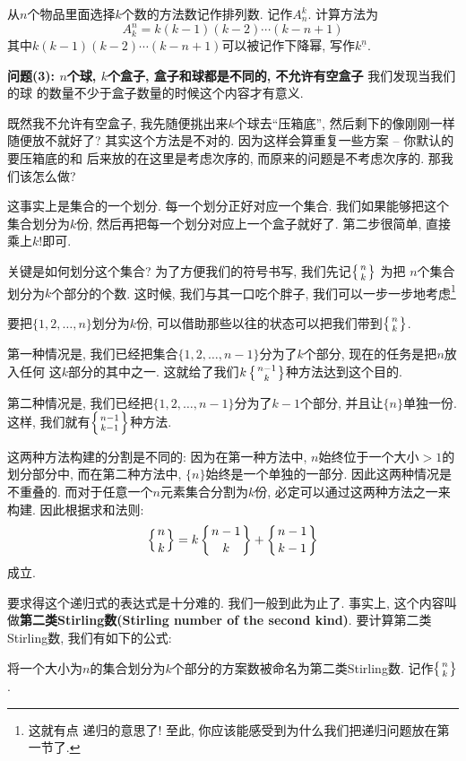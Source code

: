 \begin{definition}[排列数]
    从$n$个物品里面选择$k$个数的方法数记作排列数. 记作$A_n^k$. 计算方法为
    $$
        A_k^n = k(k-1)(k-2)\cdots(k-n+1)
    $$
    其中$k(k-1)(k-2)\cdots(k-n+1)$可以被记作下降幂, 写作$k^{\underline n}$.
\end{definition}

\textbf{问题(3): $n$个球, $k$个盒子, 盒子和球都是不同的, 不允许有空盒子} 我们发现当我们的球
的数量不少于盒子数量的时候这个内容才有意义.

既然我不允许有空盒子, 我先随便挑出来$k$个球去``压箱底'', 然后剩下的像刚刚一样
随便放不就好了? 其实这个方法是不对的. 因为这样会算重复一些方案 -- 你默认的要压箱底的和
后来放的在这里是考虑次序的, 而原来的问题是不考虑次序的. 那我们该怎么做?

这事实上是集合的一个划分. 每一个划分正好对应一个集合. 我们如果能够把这个集合划分为$k$份,
然后再把每一个划分对应上一个盒子就好了. 第二步很简单, 直接乘上$k!$即可.

关键是如何划分这个集合? 为了方便我们的符号书写, 我们先记$\left\{{n \atop k}\right\}$ 为把
$n$个集合划分为$k$个部分的个数. 这时候, 我们与其一口吃个胖子, 我们可以一步一步地考虑\footnote{这就有点
    递归的意思了! 至此, 你应该能感受到为什么我们把递归问题放在第一节了. }

要把$\{1,2,\ldots,n\}$划分为$k$份, 可以借助那些以往的状态可以把我们带到$\left\{{n \atop k}\right\}$.

第一种情况是, 我们已经把集合$\{1,2,\ldots,{n-1}\}$分为了$k$个部分, 现在的任务是把$n$放入任何
这$k$部分的其中之一. 这就给了我们$k\left\{{n-1 \atop k}\right\}$种方法达到这个目的.

第二种情况是, 我们已经把$\{1,2,\ldots,{n-1}\}$分为了$k-1$个部分, 并且让$\{n\}$单独一份.
这样, 我们就有$\left\{{n-1 \atop k-1}\right\}$种方法.

这两种方法构建的分割是不同的: 因为在第一种方法中, $n$始终位于一个大小$>1$的划分部分中,
而在第二种方法中, $\{n\}$始终是一个单独的一部分. 因此这两种情况是不重叠的.
而对于任意一个$n$元素集合分割为$k$份, 必定可以通过这两种方法之一来构建. 因此根据求和法则:
$$
    \left\{{n \atop k}\right\}=k\left\{{n-1 \atop k}\right\}+\left\{{n-1 \atop k-1}\right\}
$$
成立.

要求得这个递归式的表达式是十分难的. 我们一般到此为止了. 事实上, 这个内容叫做{\textbf{第二类Stirling数(Stirling number of the second kind)}}.
要计算第二类Stirling数, 我们有如下的公式:

\begin{definition}[第二类Stirling数]
    将一个大小为$n$的集合划分为$k$个部分的方案数被命名为第二类Stirling数. 记作$\left\{{n \atop k}\right\}$.
\end{definition}

